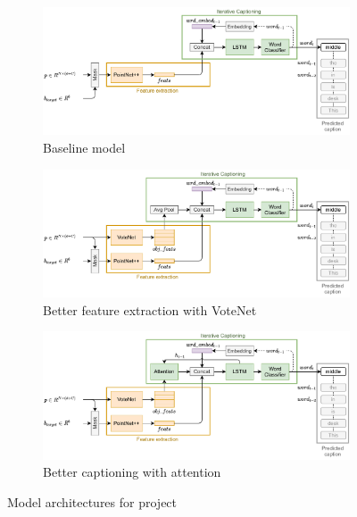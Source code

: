 \documentclass[10pt,twocolumn,letterpaper]{article}
\begin{document}
\begin{figure}
	\begin{subfigure}[c]{\textwidth}
		\centering
		\includegraphics[width=\textwidth]{figures/arch_baseline.pdf}
		\caption{Baseline model}
		\label{fig:baseline}
	\end{subfigure}
	\begin{subfigure}[c]{\textwidth}
		\centering
		\includegraphics[width=\textwidth]{figures/arch_votenet.pdf}
		\caption{Better feature extraction with VoteNet}
		\label{fig:votenet}
	\end{subfigure}
	\begin{subfigure}[c]{\textwidth}
		\centering
		\includegraphics[width=\textwidth]{figures/arch_attention.pdf}
		\caption{Better captioning with attention}
		\label{fig:attention}
	\end{subfigure}
	\caption{Model architectures for project}
	\label{fig:architectures}
\end{figure}

{\small


}
\end{document}

